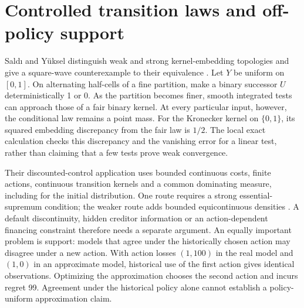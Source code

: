 \section{Controlled transition laws and off-policy support}
Sald\i{} and Y\"uksel distinguish weak and strong kernel-embedding topologies
and give a square-wave counterexample to their equivalence
\cite[Theorem~4.1 and proof]{litclosekerneltop}. Let $Y$ be uniform on $[0,1]$.
On alternating half-cells of a fine partition, make a binary successor $U$
deterministically 1 or 0. As the partition becomes finer, smooth integrated
tests can approach those of a fair binary kernel. At every particular input,
however, the conditional law remains a point mass. For the Kronecker kernel
on $\{0,1\}$, its squared embedding discrepancy from the fair law is $1/2$.
The local exact calculation checks this discrepancy and the vanishing error
for a linear test, rather than claiming that a few tests prove weak convergence.

Their discounted-control application uses bounded continuous costs, finite
actions, continuous transition kernels and a common dominating measure, including
for the initial distribution. One route requires a strong essential-supremum
condition; the weaker route adds bounded equicontinuous densities
\cite[Assumptions~2--4, equation~(11), Theorems~5.1--5.2]{litclosekerneltop}.
A default discontinuity, hidden creditor information or an action-dependent
financing constraint therefore needs a separate argument. An equally important
problem is support: models that agree under the historically chosen action may
disagree under a new action. With action losses $(1,100)$ in the real model and
$(1,0)$ in an approximate model, historical use of the first action gives
identical observations. Optimizing the approximation chooses the second action
and incurs regret 99. Agreement under the historical policy alone cannot
establish a policy-uniform approximation claim.
